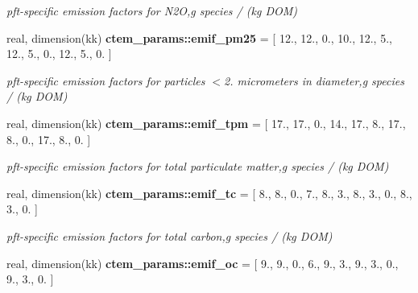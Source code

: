 \begin{DoxyCompactItemize}
\begin{DoxyCompactList}\small\item\em pft-\/specific emission factors for N2\+O,g species / (kg D\+O\+M) \end{DoxyCompactList}\item 
\hypertarget{namespacectem__params_a89f38c6366d839a93b4cb499ecb49b6b}{}real, dimension(kk) {\bfseries ctem\+\_\+params\+::emif\+\_\+pm25} = \mbox{[} 12., 12., 0., 10., 12., 5., 12., 5., 0., 12., 5., 0. \mbox{]}\label{namespacectem__params_a89f38c6366d839a93b4cb499ecb49b6b}

\begin{DoxyCompactList}\small\item\em pft-\/specific emission factors for particles $<$2. micrometers in diameter,g species / (kg D\+O\+M) \end{DoxyCompactList}\item 
\hypertarget{namespacectem__params_a963896fb7e7da4daecc87391c68c903e}{}real, dimension(kk) {\bfseries ctem\+\_\+params\+::emif\+\_\+tpm} = \mbox{[} 17., 17., 0., 14., 17., 8., 17., 8., 0., 17., 8., 0. \mbox{]}\label{namespacectem__params_a963896fb7e7da4daecc87391c68c903e}

\begin{DoxyCompactList}\small\item\em pft-\/specific emission factors for total particulate matter,g species / (kg D\+O\+M) \end{DoxyCompactList}\item 
\hypertarget{namespacectem__params_a3c3f54dc0014275a3c519f419392bfc9}{}real, dimension(kk) {\bfseries ctem\+\_\+params\+::emif\+\_\+tc} = \mbox{[} 8., 8., 0., 7., 8., 3., 8., 3., 0., 8., 3., 0. \mbox{]}\label{namespacectem__params_a3c3f54dc0014275a3c519f419392bfc9}

\begin{DoxyCompactList}\small\item\em pft-\/specific emission factors for total carbon,g species / (kg D\+O\+M) \end{DoxyCompactList}\item 
\hypertarget{namespacectem__params_a430c392f52f3c3c0be45b52919c33da9}{}real, dimension(kk) {\bfseries ctem\+\_\+params\+::emif\+\_\+oc} = \mbox{[} 9., 9., 0., 6., 9., 3., 9., 3., 0., 9., 3., 0. \mbox{]}\label{namespacectem__params_a430c392f52f3c3c0be45b52919c33da9}


\end{DoxyCompactItemize}
